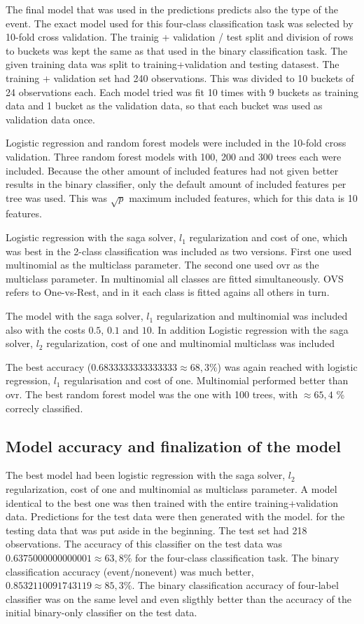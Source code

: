 \documentclass[a4size, 12pt]{report}
\begin{document}
	The final model that was used in the predictions predicts also the type of the event. The exact model used for this four-class classification task was selected by 10-fold cross validation. The trainig + validation / test split and division of rows to buckets was kept the same as that used in the binary classification task. The given training data was split to training+validation and testing datasest. The training + validation set had 240 observations. This was divided to 10 buckets of 24 observations each. Each model tried was fit 10 times with 9 buckets as training data and 1 bucket as the validation data, so that each bucket was used as validation data once. 
	
	Logistic regression and random forest models were included in the 10-fold cross validation. Three random forest models with 100, 200 and 300 trees each were included. Because the other amount of included features had not given better results in the binary classifier, only the default amount of included features per tree was used. This was $\sqrt{p}$ maximum included features, which for this data is 10 features. 
	
	Logistic regression  with the saga solver, $l_1$ regularization and cost of one, which was best in the 2-class classification was included as two versions. First one used multinomial as the multiclass parameter. The second one used ovr as the multiclass parameter. In multinomial all classes are fitted simultaneously. OVS refers to One-vs-Rest, and in it each class is fitted agains all others in turn. 
	
The model with the saga solver, $l_1$ regularization and multinomial was included also with the costs $0.5$, $0.1$ and $10$. 	In addition Logistic regression with the saga solver, $l_2$ regularization, cost of one and multinomial multiclass was included
	
The best accuracy ($0.6833333333333333 \approx 68,3 \%$) was again reached with logistic regression, $l_1$ regularisation and cost of one. Multinomial performed better than ovr. The best random forest model was the one with 100 trees, with $\approx 65,4$ \% correcly classified.  
	
\subsection*{Model accuracy and finalization of the model}

	The best model had been logistic regression with the saga solver, $l_2$ regularization, cost of one and multinomial as multiclass parameter. A model identical to the best one was then trained with the entire training+validation data. Predictions for the test data were then generated with the model. for the testing data that was put aside in the beginning. The test set had 218 observations. The accuracy of this classifier on the test data was $0.6375000000000001 \approx 63,8 \% $ for the four-class classification task.	The binary classification accuracy (event/nonevent) was much better, $0.8532110091743119 \approx 85,3 \%$.  The binary classification accuracy of four-label classifier was on the same level and even sligthly better than the accuracy of the initial binary-only classifier on the test data.
	
\end{document}
